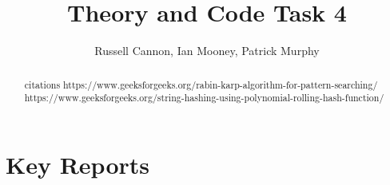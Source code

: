 \documentclass[12pt]{article}
\begin{document}
\title{Theory and Code Task 4}
\author{Russell Cannon, Ian Mooney, Patrick Murphy}

\maketitle
\singlespacing

\begin{abstract}
\begin{center}
citations
https://www.geeksforgeeks.org/rabin-karp-algorithm-for-pattern-searching/
https://www.geeksforgeeks.org/string-hashing-using-polynomial-rolling-hash-function/
\end{center}
\end{abstract}

\newpage

\section{Key Reports}
\end{document}
